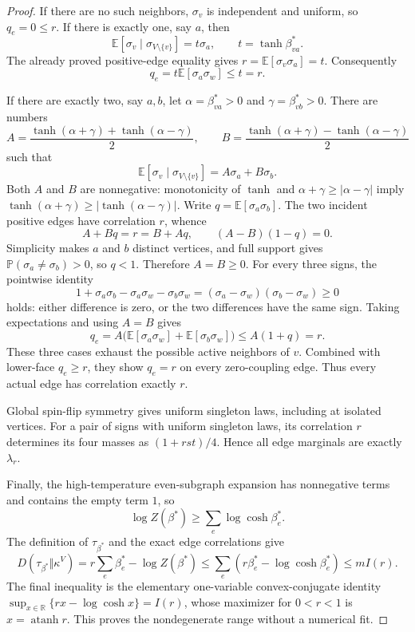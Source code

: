 \begin{proof}
If there are no such neighbors, $\sigma_v$ is independent and uniform,
so $q_e=0\leq r$.
If there is exactly one, say $a$, then
\[
 \mathbb E[\sigma_v\mid\sigma_{V\setminus\{v\}}]
      =t\sigma_a,\qquad t=\tanh\beta_{va}^*.
\]
The already proved positive-edge equality gives
$r=\mathbb E[\sigma_v\sigma_a]=t$.  Consequently
\[
 q_e=t\mathbb E[\sigma_a\sigma_w]\leq t=r.
\]

If there are exactly two, say $a,b$, let
$\alpha=\beta_{va}^*>0$ and $\gamma=\beta_{vb}^*>0$.  There are
numbers
\[
 A=\frac{\tanh(\alpha+\gamma)+\tanh(\alpha-\gamma)}2,
 \qquad
 B=\frac{\tanh(\alpha+\gamma)-\tanh(\alpha-\gamma)}2
\]
such that
\[
 \mathbb E[\sigma_v\mid\sigma_{V\setminus\{v\}}]
       =A\sigma_a+B\sigma_b.
\]
Both $A$ and $B$ are nonnegative: monotonicity of $\tanh$ and
$\alpha+\gamma\geq|\alpha-\gamma|$ imply
$\tanh(\alpha+\gamma)\geq|\tanh(\alpha-\gamma)|$.
Write $q=\mathbb E[\sigma_a\sigma_b]$.  The two incident positive
edges have correlation $r$, whence
\[
 A+Bq=r=B+Aq,\qquad (A-B)(1-q)=0.
\]
Simplicity makes $a$ and $b$ distinct vertices, and full support gives
$\mathbb P(\sigma_a\ne\sigma_b)>0$, so $q<1$.
Therefore $A=B\geq0$.  For every three signs, the pointwise identity
\[
 1+\sigma_a\sigma_b-\sigma_a\sigma_w-\sigma_b\sigma_w
       =(\sigma_a-\sigma_w)(\sigma_b-\sigma_w)\geq0
\]
holds: either difference is zero, or the two differences have the same sign.
Taking expectations and using $A=B$ gives
\[
 q_e=A\bigl(\mathbb E[\sigma_a\sigma_w]
              +\mathbb E[\sigma_b\sigma_w]\bigr)
      \leq A(1+q)=r.
\]
These three cases exhaust the possible active neighbors of $v$.
Combined with lower-face $q_e\geq r$, they show $q_e=r$ on every
zero-coupling edge.  Thus every actual edge has correlation exactly $r$.

Global spin-flip symmetry gives uniform singleton laws, including at
isolated vertices.  For a pair of signs with uniform singleton laws,
its correlation $r$ determines its four masses as
$(1+rst)/4$.  Hence all edge marginals are exactly $\lambda_r$.

Finally, the high-temperature even-subgraph expansion has nonnegative
terms and contains the empty term $1$, so
\[
 \log Z(\beta^*)\geq\sum_e\log\cosh\beta_e^*.
\]
The definition of $\tau_{\beta^*}$ and the exact edge correlations give
\[
 D(\tau_{\beta^*}\Vert\kappa^{V})
   =r\sum_e\beta_e^*-\log Z(\beta^*)
   \leq\sum_e\left(r\beta_e^*-\log\cosh\beta_e^*\right)
   \leq mI(r).
\]
The final inequality is the elementary one-variable convex-conjugate
identity
$\sup_{x\in\mathbb R}\{rx-\log\cosh x\}=I(r)$,
whose maximizer for $0<r<1$ is $x=\operatorname{atanh}r$.
This proves the nondegenerate range without a numerical fit.


\end{proof}
